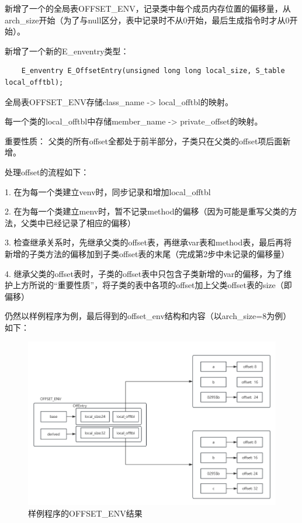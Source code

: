 \documentclass{article}
\begin{document}
新增了一个的全局表OFFSET\_ENV，记录类中每个成员内存位置的偏移量，从arch\_size开始（为了与null区分，表中记录时不从0开始，最后生成指令时才从0开始）。

新增了一个新的E\_enventry类型：

    \begin{lstlisting}
    E_enventry E_OffsetEntry(unsigned long long local_size, S_table local_offtbl);
    \end{lstlisting}

全局表OFFSET\_ENV存储class\_name -> local\_offtbl的映射。

每一个类的local\_offtbl中存储member\_name -> private\_offset的映射。

重要性质： 父类的所有offset全都处于前半部分，子类只在父类的offset项后面新增。

处理offset的流程如下：

    1. 在为每一个类建立venv时，同步记录和增加local\_offtbl

    2. 在为每一个类建立menv时，暂不记录method的偏移（因为可能是重写父类的方法，父类中已经记录了相应的偏移）

    3. 检查继承关系时，先继承父类的offset表，再继承var表和method表，最后再将新增的子类方法的偏移加到子类offset表的末尾（完成第2步中未记录的偏移量）

    4. 继承父类的offset表时，子类的offset表中只包含子类新增的var的偏移，为了维护上方所说的“重要性质”，将子类的表中各项的offset加上父类offset表的size（即偏移）

仍然以样例程序为例，最后得到的offset\_env结构和内容（以arch\_size=8为例）如下：
\begin{figure}[h]
  \centering
  \includegraphics[width=.9\linewidth]{pics/off_env.jpg}
  \caption{样例程序的OFFSET\_ENV结果}
  \label{fig:oenv}
\end{figure}
\end{document}
